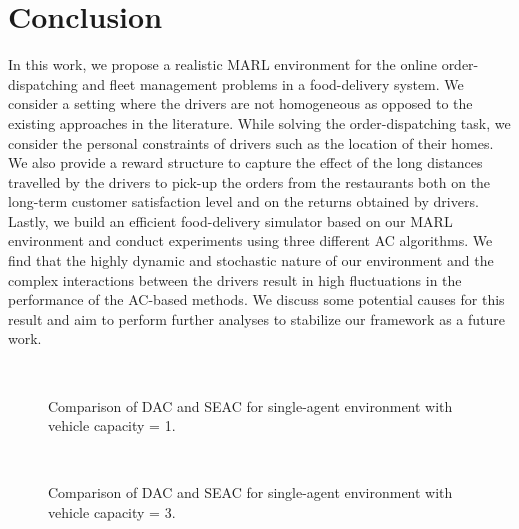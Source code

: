 \documentclass{article}
\theoremstyle{defn}
\theoremstyle{prop}
\theoremstyle{assm}
\theoremstyle{theoremm}
\theoremstyle{remarkk}
\theoremstyle{lem}
\theoremstyle{example}
\theoremstyle{example}
\begin{document}
\section{Conclusion}\label{conc}
In this work, we propose a realistic MARL environment for the online order-dispatching and fleet management problems in a food-delivery system. We consider a setting where the drivers are not homogeneous as opposed to the existing approaches in the literature. While solving the order-dispatching task, we consider the personal constraints of drivers such as the location of their homes. We also provide a reward structure to capture the effect of the long distances travelled by the drivers to pick-up the orders from the restaurants both on the long-term customer satisfaction level and on the returns obtained by drivers. Lastly, we build an efficient food-delivery simulator based on our MARL environment and conduct experiments using three different AC algorithms. We find that the highly dynamic and stochastic nature of our environment and the complex interactions between the drivers result in high fluctuations in the performance of the AC-based methods. We discuss some potential causes for this result and aim to perform further analyses to stabilize our framework as a future work.
\clearpage
\captionsetup[figure]{belowskip=-4pt}
\begin{figure}
  \centering
  \captionsetup[subfigure]{aboveskip=-5pt,belowskip=-2pt}
  \begin{subfigure}[b]{0.49\textwidth}
  \centering
  
  \caption*{}
  \label{fig:TvsTstep}
  \end{subfigure}
	\ 
  \begin{subfigure}[b]{0.49\textwidth}
  \centering
  
  \caption*{}
  \label{fig:TvsNstep}
  \end{subfigure}
  \caption{Comparison of DAC and SEAC for single-agent environment with vehicle capacity = 1.}
\end{figure}
\captionsetup[figure]{belowskip=-4pt}
\begin{figure}
  \centering
  \captionsetup[subfigure]{aboveskip=-5pt,belowskip=-2pt}
  \begin{subfigure}[b]{0.49\textwidth}
  \centering
  
  \caption*{}
  \label{fig:TvsTstep}
  \end{subfigure}
	\ 
  \begin{subfigure}[b]{0.49\textwidth}
  \centering
  
  \caption*{}
  \label{fig:TvsNstep}
  \end{subfigure}
  \caption{Comparison of DAC and SEAC for single-agent environment with vehicle capacity = 3.}
\end{figure}
\end{document}
